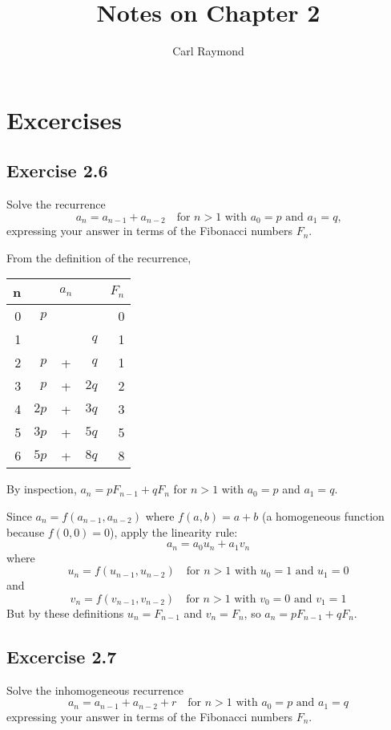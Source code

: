 \documentclass[11pt, oneside]{article}   	%
\title{Notes on Chapter 2}
\author{Carl Raymond}
\begin{document}
\maketitle

\section{Excercises}

\subsection*{Exercise 2.6} Solve the recurrence
\[
	a_n = a_{n-1} + a_{n-2} \quad \text{for $n>1$ with $a_0=p$ and $a_1=q$,}
\]
expressing your answer in terms of the Fibonacci numbers $F_n$.

From the definition of the recurrence,

\begin{tabular}{r | r c r | r}
	n	& & $a_n$ & & $F_n$ \\
	\hline
	0	& $p$ & & 			& 0 \\
	1	& & & $q$ 			& 1 \\
	2	& $p$ & {}+{} & $q$		& 1 \\
	3	& $p$ & {}+{} & $2q$		& 2 \\
	4	& $2p$ & {}+{} & $3q$ 	& 3 \\
	5	& $3p$ & {}+{} & $5q$ 	& 5 \\
	6	& $5p$ & {}+{} & $8q$	& 8
\end{tabular}

By inspection, $a_n = pF_{n-1} + qF_{n}$ for $n>1$ with $a_0=p$ and $a_1=q$.

Since $a_n = f(a_{n-1}, a_{n-2})$ where $f(a, b) = a+b$ (a homogeneous function because $f(0,0)=0$), apply the linearity rule:
\[
	a_n = a_0 u_n + a_1 v_n
\]
where
\[u_n = f(u_{n-1}, u_{n-2}) \quad \text{for $n>1$ with $u_0=1$ and $u_1=0$}\] and
\[v_n = f(v_{n-1}, v_{n-2}) \quad \text{for $n>1$ with $v_0=0$ and $v_1=1$}\]
But by these definitions $u_n = F_{n-1}$ and $v_n = F_n$, so $a_n = pF_{n-1} + qF_n$.

\subsection*{Excercise 2.7}
Solve the inhomogeneous recurrence
\[
	a_n = a_{n-1} + a_{n-2} + r \quad \text{for $n>1$ with $a_0=p$ and $a_1=q$}
\]
expressing your answer in terms of the Fibonacci numbers $F_n$.
\end{document}
